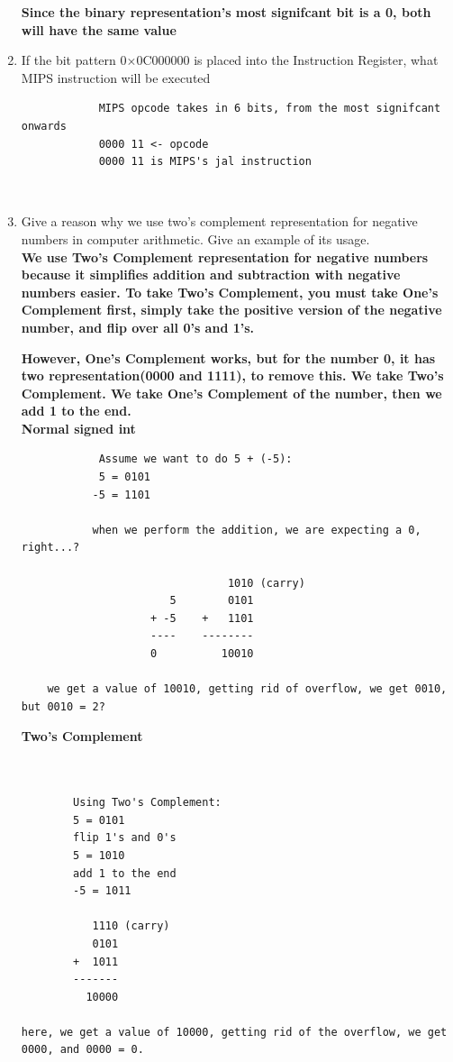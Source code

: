 \documentclass{article}
\begin{document}
\begin{enumerate}
        \textbf{Since the binary representation's most signifcant bit is a 0, both will have the same value}

        \item If the bit pattern 0×0C000000 is placed into the Instruction Register, what MIPS instruction will be executed
        \begin{verbatim}
            MIPS opcode takes in 6 bits, from the most signifcant onwards
            0000 11 <- opcode
            0000 11 is MIPS's jal instruction
        \end{verbatim}
        \begin{center}
            \\
        \end{center}
        
        \item Give a reason why we use two’s complement representation for negative numbers in computer
        arithmetic. Give an example of its usage.\\[0.25in]
        \textbf{
            We use Two's Complement representation for negative numbers 
            because it simplifies addition and subtraction with negative 
            numbers easier. To take Two's Complement, you must take One's 
            Complement first, simply take the positive version of the negative 
            number, and flip over all 0's and 1's.
        }
        
        \textbf{
            However, One's Complement works, but for the number 0, it has two
            representation(0000 and 1111), to remove this. We take Two's
            Complement. We take One's Complement of the number, then we add 1
            to the end.
        }\\[0.25in]

        \textbf{Normal signed int}
        \begin{verbatim}
            Assume we want to do 5 + (-5): 
            5 = 0101
           -5 = 1101

           when we perform the addition, we are expecting a 0, right...?
           
                                1010 (carry)
                       5        0101
                    + -5    +   1101
                    ----    --------
                    0          10010
            
    we get a value of 10010, getting rid of overflow, we get 0010, but 0010 = 2?
        \end{verbatim}

        \textbf{Two's Complement}
        \begin{verbatim}
            

        Using Two's Complement: 
        5 = 0101
        flip 1's and 0's
        5 = 1010
        add 1 to the end
        -5 = 1011

           1110 (carry)
           0101
        +  1011
        -------
          10000

here, we get a value of 10000, getting rid of the overflow, we get 0000, and 0000 = 0.
        \end{verbatim}
    \end{enumerate}
\end{document}
